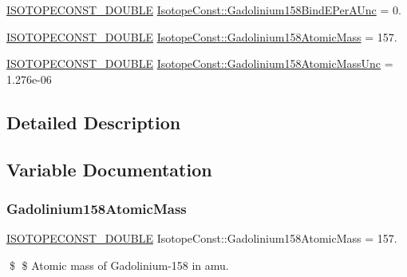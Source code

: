 \begin{DoxyCompactItemize}
\item 
\mbox{\hyperlink{group___isotope_const-_macros_ga8f45a7272ce02c0b4c65c44636ed719a}{I\+S\+O\+T\+O\+P\+E\+C\+O\+N\+S\+T\+\_\+\+D\+O\+U\+B\+LE}} \mbox{\hyperlink{group___isotope_const-_gadolinium-_gd158_ga771b079d8d87e7826cfde79ef2d7da65}{Isotope\+Const\+::\+Gadolinium158\+Bind\+E\+Per\+A\+Unc}} = 0.
\item 
\mbox{\hyperlink{group___isotope_const-_macros_ga8f45a7272ce02c0b4c65c44636ed719a}{I\+S\+O\+T\+O\+P\+E\+C\+O\+N\+S\+T\+\_\+\+D\+O\+U\+B\+LE}} \mbox{\hyperlink{group___isotope_const-_gadolinium-_gd158_ga2d7c732f6b00653b55bea9c6946d5360}{Isotope\+Const\+::\+Gadolinium158\+Atomic\+Mass}} = 157.
\item 
\mbox{\hyperlink{group___isotope_const-_macros_ga8f45a7272ce02c0b4c65c44636ed719a}{I\+S\+O\+T\+O\+P\+E\+C\+O\+N\+S\+T\+\_\+\+D\+O\+U\+B\+LE}} \mbox{\hyperlink{group___isotope_const-_gadolinium-_gd158_gadb1b0b65cc2b00b5ff45d8cbca2b79bd}{Isotope\+Const\+::\+Gadolinium158\+Atomic\+Mass\+Unc}} = 1.\+276e-\/06
\end{DoxyCompactItemize}


\subsection{Detailed Description}


\subsection{Variable Documentation}
\mbox{\label{group___isotope_const-_gadolinium-_gd158_ga2d7c732f6b00653b55bea9c6946d5360}} 
\subsubsection{\texorpdfstring{Gadolinium158\+Atomic\+Mass}{Gadolinium158AtomicMass}}
{\footnotesize\ttfamily \mbox{\hyperlink{group___isotope_const-_macros_ga8f45a7272ce02c0b4c65c44636ed719a}{I\+S\+O\+T\+O\+P\+E\+C\+O\+N\+S\+T\+\_\+\+D\+O\+U\+B\+LE}} Isotope\+Const\+::\+Gadolinium158\+Atomic\+Mass = 157.}

\$ \$ Atomic mass of Gadolinium-\/158 in amu. \mbox{\label{group___isotope_const-_gadolinium-_gd158_gadb1b0b65cc2b00b5ff45d8cbca2b79bd}} 
